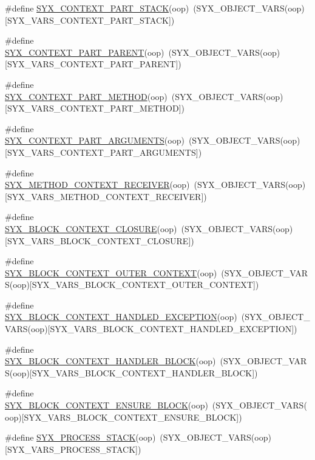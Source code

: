 \begin{CompactItemize}
\#define \hyperlink{syx-object_8h_e749658ddae9b2e6f980f63a2a8cb2f5}{SYX\_\-CONTEXT\_\-PART\_\-STACK}(oop)~(SYX\_\-OBJECT\_\-VARS(oop)\mbox{[}SYX\_\-VARS\_\-CONTEXT\_\-PART\_\-STACK\mbox{]})
\item 
\#define \hyperlink{syx-object_8h_2b5212d0c18b2ba6e55fdec8f33625b8}{SYX\_\-CONTEXT\_\-PART\_\-PARENT}(oop)~(SYX\_\-OBJECT\_\-VARS(oop)\mbox{[}SYX\_\-VARS\_\-CONTEXT\_\-PART\_\-PARENT\mbox{]})
\item 
\#define \hyperlink{syx-object_8h_df6a9f8fef4d817ec6c930a40a9841bb}{SYX\_\-CONTEXT\_\-PART\_\-METHOD}(oop)~(SYX\_\-OBJECT\_\-VARS(oop)\mbox{[}SYX\_\-VARS\_\-CONTEXT\_\-PART\_\-METHOD\mbox{]})
\item 
\#define \hyperlink{syx-object_8h_a84583cd063bb91509a65e846f2a0b68}{SYX\_\-CONTEXT\_\-PART\_\-ARGUMENTS}(oop)~(SYX\_\-OBJECT\_\-VARS(oop)\mbox{[}SYX\_\-VARS\_\-CONTEXT\_\-PART\_\-ARGUMENTS\mbox{]})
\item 
\#define \hyperlink{syx-object_8h_55222831a7e6ae8717b66ecb10d077b5}{SYX\_\-METHOD\_\-CONTEXT\_\-RECEIVER}(oop)~(SYX\_\-OBJECT\_\-VARS(oop)\mbox{[}SYX\_\-VARS\_\-METHOD\_\-CONTEXT\_\-RECEIVER\mbox{]})
\item 
\#define \hyperlink{syx-object_8h_ba94eb81806582fdd6ada41055269946}{SYX\_\-BLOCK\_\-CONTEXT\_\-CLOSURE}(oop)~(SYX\_\-OBJECT\_\-VARS(oop)\mbox{[}SYX\_\-VARS\_\-BLOCK\_\-CONTEXT\_\-CLOSURE\mbox{]})
\item 
\#define \hyperlink{syx-object_8h_901ec826ea0223727b4271aed6242876}{SYX\_\-BLOCK\_\-CONTEXT\_\-OUTER\_\-CONTEXT}(oop)~(SYX\_\-OBJECT\_\-VARS(oop)\mbox{[}SYX\_\-VARS\_\-BLOCK\_\-CONTEXT\_\-OUTER\_\-CONTEXT\mbox{]})
\item 
\#define \hyperlink{syx-object_8h_11ae3cc8275b7b52858768d9756f2604}{SYX\_\-BLOCK\_\-CONTEXT\_\-HANDLED\_\-EXCEPTION}(oop)~(SYX\_\-OBJECT\_\-VARS(oop)\mbox{[}SYX\_\-VARS\_\-BLOCK\_\-CONTEXT\_\-HANDLED\_\-EXCEPTION\mbox{]})
\item 
\#define \hyperlink{syx-object_8h_375684bc34c3a90f590eda5b4b3ae62f}{SYX\_\-BLOCK\_\-CONTEXT\_\-HANDLER\_\-BLOCK}(oop)~(SYX\_\-OBJECT\_\-VARS(oop)\mbox{[}SYX\_\-VARS\_\-BLOCK\_\-CONTEXT\_\-HANDLER\_\-BLOCK\mbox{]})
\item 
\#define \hyperlink{syx-object_8h_3616e0a78f2864fb41d8fb1763351d61}{SYX\_\-BLOCK\_\-CONTEXT\_\-ENSURE\_\-BLOCK}(oop)~(SYX\_\-OBJECT\_\-VARS(oop)\mbox{[}SYX\_\-VARS\_\-BLOCK\_\-CONTEXT\_\-ENSURE\_\-BLOCK\mbox{]})
\item 
\#define \hyperlink{syx-object_8h_7c831375f6160c5b537d391cab06e10e}{SYX\_\-PROCESS\_\-STACK}(oop)~(SYX\_\-OBJECT\_\-VARS(oop)\mbox{[}SYX\_\-VARS\_\-PROCESS\_\-STACK\mbox{]})

\end{CompactItemize}
